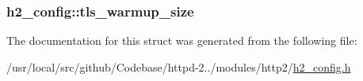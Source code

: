 \subsubsection[{\texorpdfstring{tls\+\_\+warmup\+\_\+size}{tls_warmup_size}}]{ h2\+\_\+config\+::tls\+\_\+warmup\+\_\+size}\hypertarget{structh2__config_a2159a7ccda9c4a728ff1c40d87b50882}{}\label{structh2__config_a2159a7ccda9c4a728ff1c40d87b50882}


The documentation for this struct was generated from the following file\+:\begin{DoxyCompactItemize}
\item 
/usr/local/src/github/\+Codebase/httpd-\/2../modules/http2/\hyperlink{h2__config_8h}{h2\+\_\+config.\+h}\end{DoxyCompactItemize}
